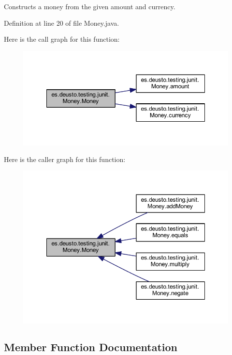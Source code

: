Constructs a money from the given amount and currency. 

Definition at line 20 of file Money.\+java.

Here is the call graph for this function\+:
\nopagebreak
\begin{figure}[H]
\begin{center}
\leavevmode
\includegraphics[width=348pt]{classes_1_1deusto_1_1testing_1_1junit_1_1_money_a6f1749eb364c59ed038f79cf8965e3bc_cgraph}
\end{center}
\end{figure}
Here is the caller graph for this function\+:
\nopagebreak
\begin{figure}[H]
\begin{center}
\leavevmode
\includegraphics[width=348pt]{classes_1_1deusto_1_1testing_1_1junit_1_1_money_a6f1749eb364c59ed038f79cf8965e3bc_icgraph}
\end{center}
\end{figure}


\subsection{Member Function Documentation}
\mbox{\label{classes_1_1deusto_1_1testing_1_1junit_1_1_money_a6a3d64861c49dee89ffd0ed0c576045d}} 
